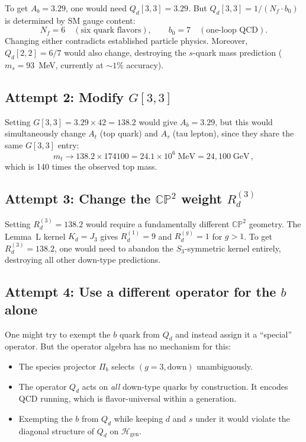 \documentclass[11pt,a4paper]{article}
\newcommand{\CP}{\mathbb{CP}}
\theoremstyle{definition}
\theoremstyle{remark}
\begin{document}
To get $A_b = 3.29$, one would need $Q_d[3,3] = 3.29$.  But $Q_d[3,3] =
1/(N_f \cdot b_0)$ is determined by SM gauge content:
\begin{equation}
N_f = 6 \quad (\text{six quark flavors}), \qquad
b_0 = 7 \quad (\text{one-loop QCD}).
\end{equation}
Changing either contradicts established particle physics.
Moreover, $Q_d[2,2] = 6/7$ would also change, destroying the
$s$-quark mass prediction ($m_s = 93$~MeV, currently at $\sim 1\%$ accuracy).

\subsection{Attempt 2: Modify $G[3,3]$}

Setting $G[3,3] = 3.29 \times 42 = 138.2$ would give $A_b = 3.29$, but
this would simultaneously change $A_t$ (top quark) and $A_\tau$ (tau lepton),
since they share the same $G[3,3]$ entry:
\begin{equation}
m_t \to 138.2 \times 174100 = 24.1 \times 10^6 \;\text{MeV} = 24{,}100\;\text{GeV}\,,
\end{equation}
which is 140 times the observed top mass.

\subsection{Attempt 3: Change the $\CP^2$ weight $R_d^{(3)}$}

Setting $R_d^{(3)} = 138.2$ would require a fundamentally different $\CP^2$
geometry.  The Lemma~L kernel $K_d = J_3$ gives $R_d^{(1)} = 9$ and
$R_d^{(g)} = 1$ for $g > 1$.  To get $R_d^{(3)} = 138.2$, one would need
to abandon the $S_3$-symmetric kernel entirely, destroying all other
down-type predictions.

\subsection{Attempt 4: Use a different operator for the $b$ alone}

One might try to exempt the $b$ quark from $Q_d$ and instead assign it a
``special'' operator.  But the operator algebra has no mechanism for this:
\begin{itemize}
\item The species projector $\Pi_b$ selects $(g=3, \text{down})$
      unambiguously.
\item The operator $Q_d$ acts on \emph{all} down-type quarks by construction.
      It encodes QCD running, which is flavor-universal within a generation.
\item Exempting the $b$ from $Q_d$ while keeping $d$ and $s$ under it
      would violate the diagonal structure of $Q_d$ on $\mathcal{H}_{\text{gen}}$.
\end{itemize}
\end{document}
